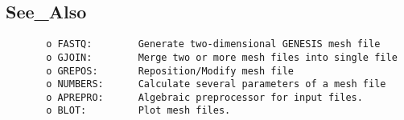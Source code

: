 \subsection{See\_Also}
\begin{verbatim}
       o FASTQ:        Generate two-dimensional GENESIS mesh file
       o GJOIN:        Merge two or more mesh files into single file
       o GREPOS:       Reposition/Modify mesh file
       o NUMBERS:      Calculate several parameters of a mesh file
       o APREPRO:      Algebraic preprocessor for input files.
       o BLOT:         Plot mesh files.
\end{verbatim}



